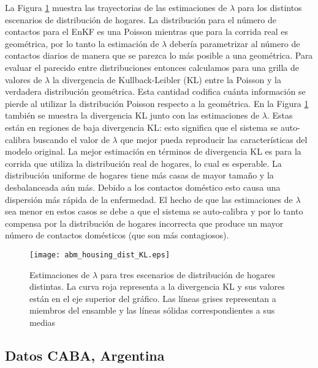 La Figura \ref{fig:abm_housing_dist_KL} muestra las trayectorias de las estimaciones de $\lambda$ para los distintos escenarios de distribución de hogares. La distribución para el número de contactos para el EnKF es una Poisson mientras que para la corrida real es geométrica, por lo tanto la estimación de $\lambda$ debería parametrizar al número de contactos diarios de manera que se parezca lo más posible a una geométrica. Para evaluar el parecido entre distribuciones entonces calculamos para una grilla de valores de $\lambda$ la divergencia de Kullback-Leibler (KL) entre la Poisson y la verdadera distribución geométrica. Esta cantidad codifica cuánta información se pierde al utilizar la distribución Poisson respecto a la geométrica. En la Figura \ref{fig:abm_housing_dist_KL} también se muestra la divergencia KL junto con las estimaciones de $\lambda$. Estas están en regiones de baja divergencia KL: esto significa que el sistema se auto-calibra buscando el valor de $\lambda$ que mejor pueda reproducir las características del modelo original. La mejor estimación en términos de divergencia KL es para la corrida que utiliza la distribución real de hogares, lo cual es esperable. La distribución uniforme de hogares tiene más casas de mayor tamaño y la desbalanceada aún más. Debido a los contactos doméstico esto causa una dispersión más rápida de la enfermedad. El hecho de que las estimaciones de $\lambda$ sea menor en estos casos se debe a que el sistema se auto-calibra y por lo tanto compensa por la distribución de hogares incorrecta que produce un mayor número de contactos domésticos (que son más contagiosos).
\begin{figure}[h]
    \centering
    \texttt{[image: abm\_housing\_dist\_KL.eps]}
    \caption{Estimaciones de $\lambda$ para tres escenarios de distribución de hogares distintas. La curva roja representa a la divergencia KL y sus valores están en el eje superior del gráfico. Las líneas grises representan a miembros del ensamble y las líneas sólidas correspondientes a sus medias}
    \label{fig:abm_housing_dist_KL}
\end{figure}

\subsection{Datos CABA, Argentina}

